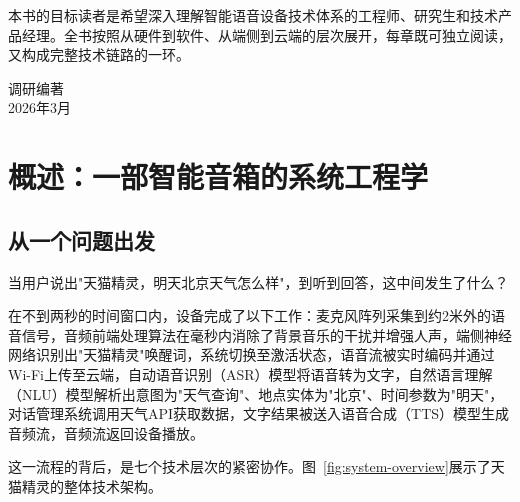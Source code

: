 \documentclass[12pt, a4paper, twoside, openright]{book}
\begin{document}
本书的目标读者是希望深入理解智能语音设备技术体系的工程师、研究生和技术产品经理。全书按照从硬件到软件、从端侧到云端的层次展开，每章既可独立阅读，又构成完整技术链路的一环。

\vspace{1cm}
\begin{flushright}
  调研编著\\
  2026年3月
\end{flushright}

\tableofcontents

\mainmatter

\chapter{概述：一部智能音箱的系统工程学}
\label{chap:overview}

\section{从一个问题出发}

当用户说出"天猫精灵，明天北京天气怎么样"，到听到回答，这中间发生了什么？

在不到两秒的时间窗口内，设备完成了以下工作：麦克风阵列采集到约2米外的语音信号，音频前端处理算法在毫秒内消除了背景音乐的干扰并增强人声，端侧神经网络识别出"天猫精灵"唤醒词，系统切换至激活状态，语音流被实时编码并通过Wi-Fi上传至云端，自动语音识别（ASR）模型将语音转为文字，自然语言理解（NLU）模型解析出意图为"天气查询"、地点实体为"北京"、时间参数为"明天"，对话管理系统调用天气API获取数据，文字结果被送入语音合成（TTS）模型生成音频流，音频流返回设备播放。

这一流程的背后，是七个技术层次的紧密协作。图~\ref{fig:system-overview}展示了天猫精灵的整体技术架构。
\end{document}
